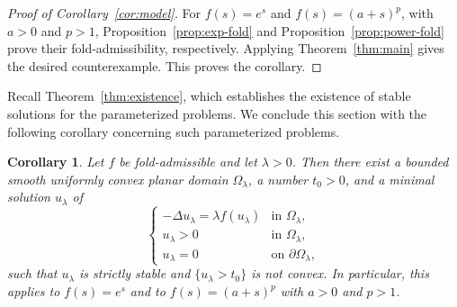 \documentclass[reqno,12pt]{amsart}
\numberwithin{equation}{section}
\newtheorem{corollary}[theorem]{Corollary}
\theoremstyle{remark}
\begin{document}
 
\begin{proof}[Proof of Corollary~\ref{cor:model}]
For $f(s)=e^s$ and $f(s)=(a+s)^p$, with $a>0$ and $p>1$,
Proposition~\ref{prop:exp-fold}  and Proposition~\ref{prop:power-fold} prove  their fold-admissibility, respectively.  Applying Theorem~\ref{thm:main} gives the desired counterexample.  This proves the corollary.
\end{proof}

Recall Theorem~\ref{thm:existence}, which establishes the existence of stable solutions for the parameterized problems. We conclude this section with the following corollary concerning such parameterized problems.

\begin{corollary} \label{cor:parameter-version}
Let $f$ be fold-admissible and let $\lambda>0$.  Then there exist a bounded
smooth uniformly convex planar domain $\Omega_\lambda$, a number $t_0>0$, and
a minimal solution $u_\lambda$ of
$$
\begin{cases}
-\Delta u_\lambda=\lambda f(u_\lambda) & \text{in }\Omega_\lambda,\\
u_\lambda>0 & \text{in }\Omega_\lambda,\\
u_\lambda=0 & \text{on }\partial\Omega_\lambda,
\end{cases}
$$
such that $u_\lambda$ is strictly stable and $\{u_\lambda>t_0\}$ is not
convex.  In particular, this applies to $f(s)=e^s$ and to
$f(s)=(a+s)^p$ with $a>0$ and $p>1$.
\end{corollary}
\end{document}
